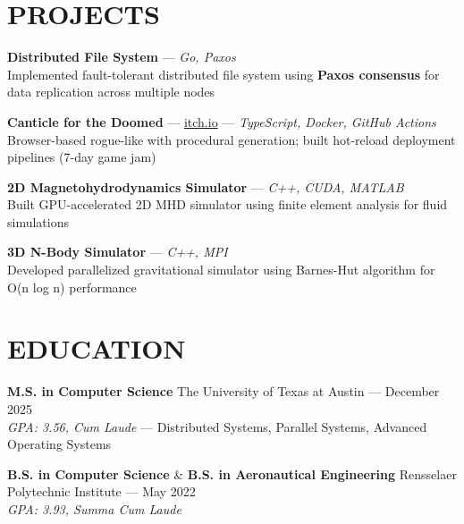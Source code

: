 \documentclass{article}
\begin{document}
\section*{PROJECTS}
\textbf{Distributed File System} — \textit{Go, Paxos} \\
Implemented fault-tolerant distributed file system using \textbf{Paxos consensus} for data replication across multiple nodes

\textbf{Canticle for the Doomed} — \href{https://sve009.itch.io/canticle-for-the-doomed}{itch.io} — \textit{TypeScript, Docker, GitHub Actions} \\
Browser-based rogue-like with procedural generation; built hot-reload deployment pipelines (7-day game jam)

\textbf{2D Magnetohydrodynamics Simulator} — \textit{C++, CUDA, MATLAB} \\
Built GPU-accelerated 2D MHD simulator using finite element analysis for fluid simulations

\textbf{3D N-Body Simulator} — \textit{C++, MPI} \\
Developed parallelized gravitational simulator using Barnes-Hut algorithm for O(n log n) performance

\section*{EDUCATION}
\textbf{M.S. in Computer Science} \hfill The University of Texas at Austin — December 2025 \\
\textit{GPA: 3.56, Cum Laude} — Distributed Systems, Parallel Systems, Advanced Operating Systems

\textbf{B.S. in Computer Science} \& \textbf{B.S. in Aeronautical Engineering} \hfill Rensselaer Polytechnic Institute — May 2022 \\
\textit{GPA: 3.93, Summa Cum Laude}
\end{document}
